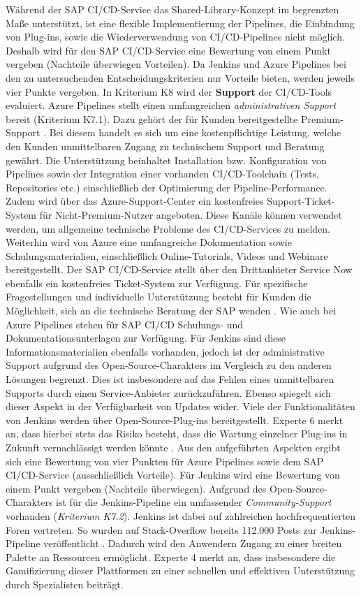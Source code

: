 Während der SAP CI/CD-Service das Shared-Library-Konzept im begrenzten Maße  unterstützt, ist eine flexible Implementierung der Pipelines, die Einbindung von Plug-ins, sowie die Wiederverwendung von CI/CD-Pipelines nicht möglich. Deshalb wird für den SAP CI/CD-Service eine Bewertung von einem Punkt vergeben (Nachteile überwiegen Vorteilen). Da Jenkins und Azure Pipelines bei den zu untersuchenden Entscheidungskriterien nur Vorteile bieten, werden jeweils vier Punkte vergeben. In Kriterium K8 wird der \textbf{Support} der CI/CD-Tools evaluiert. Azure Pipelines stellt einen umfangreichen \textit{administrativen Support} bereit (Kriterium K7.1). Dazu gehört der für Kunden bereitgestellte Premium-Support \cite{.20230410e}. Bei diesem handelt es sich um eine kostenpflichtige Leistung, welche den Kunden unmittelbaren Zugang zu technischem Support und Beratung gewährt. Die Unterstützung beinhaltet Installation bzw. Konfiguration von Pipelines sowie der Integration einer vorhanden CI/CD-Toolchain (Tests, Repositories etc.) einschließlich der Optimierung der Pipeline-Performance. Zudem wird über das Azure-Support-Center ein kostenfreies Support-Ticket-System für Nicht-Premium-Nutzer angeboten. Diese Kanäle können verwendet werden, um allgemeine technische Probleme des CI/CD-Services zu melden. Weiterhin wird von Azure eine umfangreiche Dokumentation sowie Schulungsmaterialien, einschließlich Online-Tutorials, Videos und Webinare bereitgestellt. Der SAP CI/CD-Service stellt über den Drittanbieter Service Now ebenfalls ein kostenfreies Ticket-System zur Verfügung. Für spezifische Fragestellungen und individuelle Unterstützung besteht für Kunden die Möglichkeit, sich an die technische Beratung der SAP wenden \cite[Z. 113 ff.]{ProductOwnerSAPBTPProd&Infra.}. Wie auch bei Azure Pipelines stehen für SAP CI/CD Schulungs- und Dokumentationsunterlagen zur Verfügung. Für Jenkins sind diese Informationsmaterialien ebenfalls vorhanden, jedoch ist der administrative Support aufgrund des Open-Source-Charakters im Vergleich zu den anderen Lösungen begrenzt. Dies ist insbesondere auf das Fehlen eines unmittelbaren Supports durch einen Service-Anbieter zurückzuführen. Ebenso spiegelt sich dieser Aspekt in der Verfügbarkeit von Updates wider. Viele der Funktionalitäten von Jenkins werden über Open-Source-Plug-ins bereitgestellt. Experte 6 merkt an, dass hierbei stets das Risiko besteht, dass die Wartung einzelner Plug-ins in Zukunft vernachlässigt werden könnte \cite[29 ff.]{FullStackEntwicklerSAPDTSIntegration.}. Aus den aufgeführten Aspekten ergibt sich eine Bewertung von vier Punkten für Azure Pipelines sowie dem SAP CI/CD-Service (ausschließlich Vorteile). Für Jenkins wird eine Bewertung von einem Punkt vergeben (Nachteile überwiegen). Aufgrund des Open-Source-Charakters ist für die Jenkins-Pipeline ein umfassender \textit{Community-Support} vorhanden (\textit{Kriterium K7.2}). Jenkins ist dabei auf zahlreichen hochfrequentierten Foren vertreten. So wurden auf Stack-Overflow bereits 112.000 Posts zur Jenkins-Pipeline veröffentlicht \cite{StackOverflow.20230403d}. Dadurch wird den Anwendern Zugang zu einer breiten Palette an Ressourcen ermöglicht. Experte 4 merkt an, dass insbesondere die Gamifizierung dieser Plattformen zu einer schnellen und effektiven Unterstützung durch Spezialisten beiträgt. 